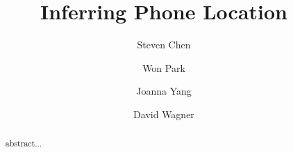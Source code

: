 \documentclass{article}
\begin{document}
\title{Inferring Phone Location}
\author{Steven Chen \and Won Park \and Joanna Yang \and David Wagner}
\maketitle

\begin{abstract}
abstract...
\end{abstract}








\nocite{}



\end{document}
